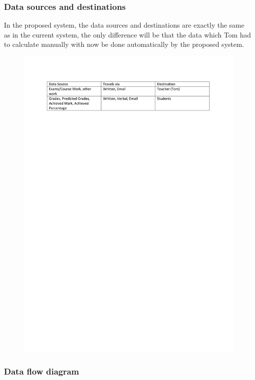 \begin{algorithm}[H]
\subsubsection{Data sources and destinations}

In the proposed system, the data sources and destinations are exactly the same as in the current system, the only difference will be that the data which Tom had to calculate manually with now be done automatically by the proposed system.

\begin{figure}[H]
    \includegraphics[width=\textwidth]{./Analysis/images/DataSourcesandDestinations.pdf}
\end{figure} 

\subsubsection{Data flow diagram}


\end{algorithm}
